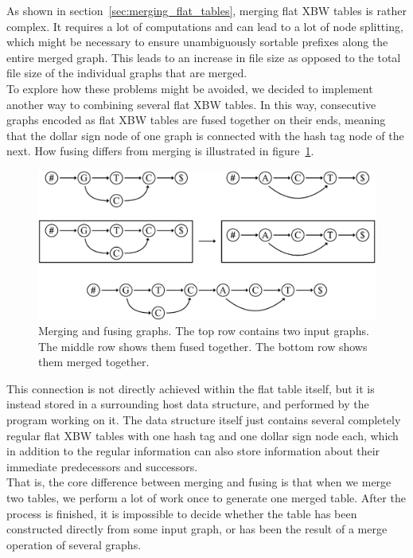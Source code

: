 \documentclass[a4paper,12pt,twoside,BCOR=10mm]{scrbook}
\begin{document}
As shown in section~\ref{sec:merging_flat_tables}, merging flat XBW tables is rather complex.
It requires a lot of computations and can lead to a lot of node splitting,
which might be necessary to ensure unambiguously sortable prefixes along the entire merged graph.
This leads to an increase in file size as opposed to the total file
size of the individual graphs that are merged. \\
To explore how these problems might be avoided,
we decided to implement another way to combining several flat XBW tables.
In this way, consecutive graphs encoded as flat XBW tables are fused together on their ends,
meaning that the dollar sign node of one graph is connected with the hash tag node of the next.
How fusing differs from merging is illustrated in figure~\ref{fig:evo_fig_merge_fuse_diffy}.
\begin{figure}[!htb]
\centering
\includegraphics[width=\textwidth]{evo_fig_merge_fuse_diffy.pdf}
\caption[Merging and fusing graphs]{Merging and fusing graphs. The top row contains two input graphs. The middle row shows them fused together. The bottom row shows them merged together.} \label{fig:evo_fig_merge_fuse_diffy}
\end{figure}
This connection is not directly achieved within the flat table itself,
but it is instead stored in a surrounding host data structure,
and performed by the program working on it.
The data structure itself just contains several completely regular flat XBW tables with
one hash tag and one dollar sign node each, which in addition to the regular information
can also store information about their immediate predecessors and successors. \\
That is, the core difference between merging and
fusing is that when we merge two tables, we perform a lot of work once
to generate one merged table. After the process is finished,
it is impossible to decide whether the table has been constructed directly
from some input graph, or has been the result of a merge operation of several graphs.
\end{document}
